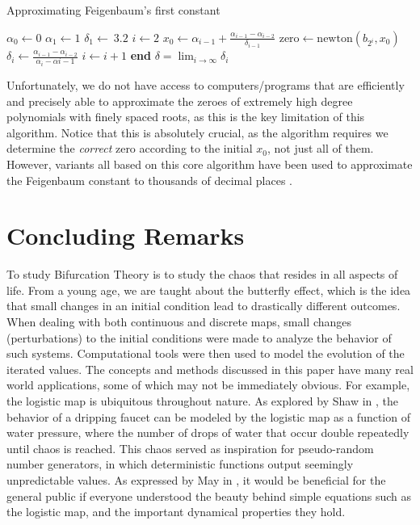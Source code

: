 \documentclass{article}
\theoremstyle{definition}
\theoremstyle{remark}
\begin{document}
\begin{algorithm}[h!]
    \caption{Approximating Feigenbaum's first constant}\label{alg:approxfeigen}
    \begin{algorithmic}[1]
    \State $\alpha_0 \gets 0$ 
    \State $\alpha_1 \gets 1$ 
    \State $\delta_1 \gets ~3.2$
    \State $i \gets 2$
        \State $x_0 \gets \alpha_{i-1} + \frac{\alpha_{i-1} - \alpha_{i-2}}{\delta_{i - 1}}$\vskip 3pt
        \State $\text{zero} \gets \textrm{newton}(b_{2^i}, x_0)$\vskip 3pt
        \State $\delta_i \gets \frac{\alpha_{i - 1} - \alpha_{i - 2}}{\alpha_{i} - \alpha{i - 1}}$\vskip 3pt
        \State $i \gets i + 1$
    \EndWhile
    \State \textbf{end} 
    \State $\delta = \lim_{i\to\infty}\delta_i$
    \end{algorithmic}
\end{algorithm}

Unfortunately, we do not have access to computers/programs that are efficiently and precisely able to approximate the zeroes of extremely high degree polynomials with finely spaced roots, as this is the key limitation of this algorithm. Notice that this is absolutely crucial, as the algorithm requires we determine the \textit{correct} zero according to the initial $x_0$, not just all of them. However, variants all based on this core algorithm have been used to approximate the Feigenbaum constant to thousands of decimal places \cite{Briggs1991}. 
\section{Concluding Remarks}
To study Bifurcation Theory is to study the chaos that resides in all aspects of life. From a young age, we are taught about the butterfly effect, which is the idea that small changes in an initial condition lead to drastically different outcomes. When dealing with both continuous and discrete maps, small changes (perturbations) to the initial conditions were made to analyze the behavior of such systems. Computational tools were then used to model the evolution of the iterated values. The concepts and methods discussed in this paper have many real world applications, some of which may not be immediately obvious. For example, the logistic map is ubiquitous throughout nature. As explored by Shaw in \cite{RS}, the behavior of a dripping faucet can be modeled by the logistic map as a function of water pressure, where the number of drops of water that occur double repeatedly until chaos is reached. This chaos served as inspiration for pseudo-random number generators, in which deterministic functions output seemingly unpredictable values. As expressed by May in \cite{May1976}, it would be beneficial for the general public if everyone understood the beauty behind simple equations such as the logistic map, and the important dynamical properties they hold.

\pagebreak

\printbibliography
\end{document}
